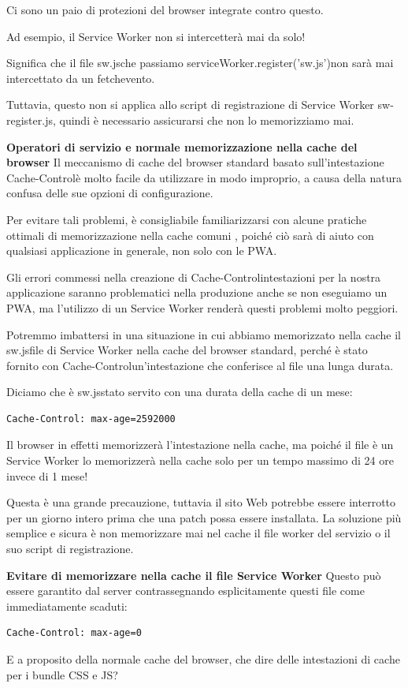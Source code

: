 \documentclass[italian]{article}
\begin{document}
Ci sono un paio di protezioni del browser integrate contro questo.

Ad esempio, il Service Worker non si intercetterà mai da solo!

Significa che il file sw.jsche passiamo serviceWorker.register('sw.js')non sarà mai intercettato da un fetchevento.

Tuttavia, questo non si applica allo script di registrazione di Service Worker sw-register.js, quindi è necessario assicurarsi che non lo memorizziamo mai.

\textbf{Operatori di servizio e normale memorizzazione nella cache del browser}
Il meccanismo di cache del browser standard basato sull'intestazione Cache-Controlè molto facile da utilizzare in modo improprio, a causa della natura confusa delle sue opzioni di configurazione.

Per evitare tali problemi, è consigliabile familiarizzarsi con alcune pratiche ottimali di memorizzazione nella cache comuni , poiché ciò sarà di aiuto con qualsiasi applicazione in generale, non solo con le PWA.

Gli errori commessi nella creazione di Cache-Controlintestazioni per la nostra applicazione saranno problematici nella produzione anche se non eseguiamo un PWA, ma l'utilizzo di un Service Worker renderà questi problemi molto peggiori.

Potremmo imbattersi in una situazione in cui abbiamo memorizzato nella cache il sw.jsfile di Service Worker nella cache del browser standard, perché è stato fornito con Cache-Controlun'intestazione che conferisce al file una lunga durata.

Diciamo che è sw.jsstato servito con una durata della cache di un mese:
\begin{lstlisting}
Cache-Control: max-age=2592000
\end{lstlisting}
Il browser in effetti memorizzerà l'intestazione nella cache, ma poiché il file è un Service Worker lo memorizzerà nella cache solo per un tempo massimo di 24 ore invece di 1 mese!

Questa è una grande precauzione, tuttavia il sito Web potrebbe essere interrotto per un giorno intero prima che una patch possa essere installata. La soluzione più semplice e sicura è non memorizzare mai nel cache il file worker del servizio o il suo script di registrazione.

\textbf{Evitare di memorizzare nella cache il file Service Worker}
Questo può essere garantito dal server contrassegnando esplicitamente questi file come immediatamente scaduti:
\begin{lstlisting}
Cache-Control: max-age=0
\end{lstlisting}
E a proposito della normale cache del browser, che dire delle intestazioni di cache per i bundle CSS e JS?
\end{document}
